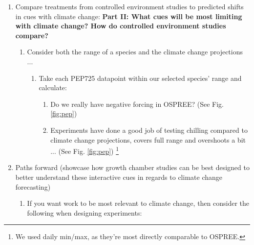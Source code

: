 \documentclass[11pt,letterpaper]{article}
\begin{document}
\begin{enumerate}
\begin{enumerate}
\begin{enumerate}
\item Explain drawback of one-cue ... you don't see interactions *and* I think you bias yourself to mainly seeing variation in the one cue so you cannot compare the relative effects of multiple cues
\item Maybe: Variation across and hemispheres? continents, time and species? 
\item Maybe: Say something about material (seeds/saplings/cuttings)? Can we tie to relevance of predicting future forest communities or such?
\end{enumerate}
\item X\% of studies manipulated which interacting cues? (i.e., how many studies manipulate 1 cues, 2 cues, 3 cues ... of those manipulating 1 cue, what is the breakdown by cue etc.) ... 43\% manipulated forcing and photo, only 10\% manipulated chilling and forcing or photo (9\% for chill x photo; 10\% for chill x force), see Fig. \ref{fig:heatmaps}
\end{enumerate}
\item Compare treatments from controlled environment studies to predicted shifts in cues with climate change: {\bf Part II: What cues will be most limiting with climate change? How do controlled environment studies compare?}
\begin{enumerate}
\item Consider both the range of a species and the climate change projections ...
\begin{enumerate}
\item Take each PEP725 datapoint within our selected species' range and calculate:
\begin{enumerate}
\item Do we really have negative forcing in OSPREE? (See Fig. \ref{fig:pep})
\item Experiments have done a good job of testing chilling compared to climate change projections, covers full range and overshoots a bit ... (See Fig. \ref{fig:pep}) \footnote{We used daily min/max, as they're most directly comparable to OSPREE.}
\end{enumerate}
\end{enumerate}
\end{enumerate}
\item Paths forward (showcase how growth chamber studies can be best designed to better understand these interactive cues in regards to climate change forecasting) 
\begin{enumerate}
\item If you want work to be most relevant to climate change, then consider the following when designing experiments:

\end{enumerate}
\end{enumerate}
\end{document}
